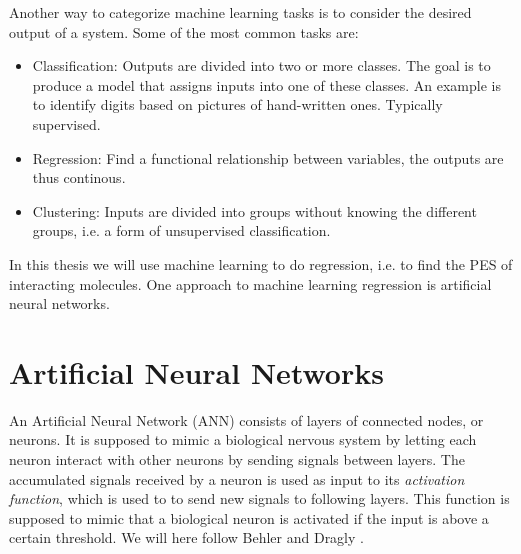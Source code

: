 \documentclass[twoside,english]{uiofysmaster}
\begin{document}
Another way to categorize machine learning tasks is to consider the desired output of a system.
Some of the most common tasks are:
\begin{itemize}
 \item Classification: Outputs are divided into two or more classes. The goal is to 
 produce a model that assigns inputs into one of these classes. An example is to identify
 digits based on pictures of hand-written ones. Typically supervised. 
 \item Regression: Find a functional relationship between variables, the outputs are thus continous. 
 \item Clustering: Inputs are divided into groups without knowing the different groups, i.e. a form of unsupervised classification.  
\end{itemize}
In this thesis we will use machine learning to do regression, i.e. to find the PES of interacting molecules.
One approach to machine learning regression is artificial neural networks. 

\section{Artificial Neural Networks}
An Artificial Neural Network (ANN) consists of layers of connected nodes, or neurons. 
It is supposed to mimic a biological nervous system by letting each neuron interact with other neurons
by sending signals between layers. The accumulated signals received by a neuron is used as input to its 
\textit{activation function}, which is used to to send new signals to following layers. This function is supposed to mimic that 
a biological neuron is activated if the input is above a certain threshold. We will here follow 
Behler \cite{Behler11general} and Dragly \cite{Dragly14}.
\end{document}
